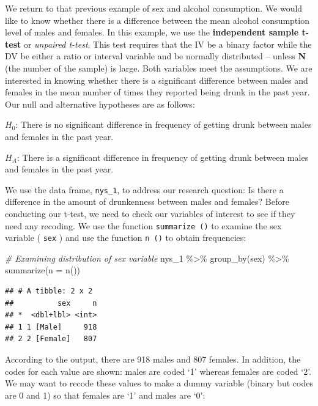 \documentclass[
]{book}
\newenvironment{Shaded}{\begin{snugshade}}{\end{snugshade}}
\newcommand{\AttributeTok}[1]{\textcolor[rgb]{0.77,0.63,0.00}{#1}}
\newcommand{\CommentTok}[1]{\textcolor[rgb]{0.56,0.35,0.01}{\textit{#1}}}
\newcommand{\FunctionTok}[1]{\textcolor[rgb]{0.00,0.00,0.00}{#1}}
\newcommand{\NormalTok}[1]{#1}
\newcommand{\SpecialCharTok}[1]{\textcolor[rgb]{0.00,0.00,0.00}{#1}}
\begin{document}
We return to that previous example of sex and alcohol consumption. We would like to know whether there is a difference between the mean alcohol consumption level of males and females. In this example, we use the \textbf{independent sample t-test} or \emph{unpaired t-test}. This test requires that the IV be a binary factor while the DV be either a ratio or interval variable and be normally distributed -- unless \textbf{N} (the number of the sample) is large. Both variables meet the assumptions. We are interested in knowing whether there is a significant difference between males and females in the mean number of times they reported being drunk in the past year. Our null and alternative hypotheses are as follows:

\(H_0\): There is no significant difference in frequency of getting drunk between males and females in the past year.

\(H_A\): There is a significant difference in frequency of getting drunk between males and females in the past year.

We use the data frame, \texttt{nys\_1}, to address our research question: Is there a difference in the amount of drunkenness between males and females? Before conducting our t-test, we need to check our variables of interest to see if they need any recoding. We use the function \texttt{summarize\ ()} to examine the sex variable ( \texttt{sex} ) and use the function \texttt{n\ ()} to obtain frequencies:

\begin{Shaded}
\begin{Highlighting}[]
\CommentTok{\# Examining distribution of sex variable}
\NormalTok{nys\_1 }\SpecialCharTok{\%\textgreater{}\%} \FunctionTok{group\_by}\NormalTok{(sex) }\SpecialCharTok{\%\textgreater{}\%} \FunctionTok{summarize}\NormalTok{(}\AttributeTok{n =} \FunctionTok{n}\NormalTok{())}
\end{Highlighting}
\end{Shaded}

\begin{verbatim}
## # A tibble: 2 x 2
##          sex     n
## *  <dbl+lbl> <int>
## 1 1 [Male]     918
## 2 2 [Female]   807
\end{verbatim}

According to the output, there are 918 males and 807 females. In addition, the codes for each value are shown: males are coded `1' whereas females are coded `2'. We may want to recode these values to make a dummy variable (binary but codes are 0 and 1) so that females are `1' and males are `0':
\end{document}
